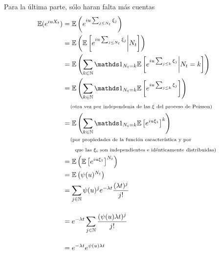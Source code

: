 Para la última parte, sólo haran falta más cuentas
\begin{align}
        \E(e^{iuX_t})   &=  \E\left( e^{iu \sum_{j \leq N_t} \xi_j }  \right)                                                                       \\
                        &=  \E\left( \E\left[e^{iu \sum_{j \leq N_t} \xi_j } \bigg| N_t \right]\right)                                              \\
                        &=  \E\left( \sum_{k \in \N} \indic_{N_t = k} \E\left[e^{iu \sum_{j \leq k} \xi_j } \bigg| N_t = k \right]\right)           \\
                        &=  \E\left( \sum_{k \in \N} \indic_{N_t = k} \E\left[e^{iu \sum_{j \leq k} \xi_j } \right]\right)                          \\
                        &\comment{otra vez por independenia de las $\xi$ del proceso de Poisson}                                                    \\
                        &=  \E\left( \sum_{k \in \N} \indic_{N_t = k} \E\left[e^{iu \xi_1 } \right]^k \right)                                       \\
                        &\lcomment{por propiedades de la función característica y por}                                                              \\
                        &\rcomment{ que las $\xi_i$ son independientes e idénticamente distribuidas}                                                \\
                        &=  \E\left( \E\left[e^{iu \xi_1 } \right]^{N_t} \right)                                                                    \\
                        &=  \E\left( \psi(u)^{N_t} \right)                                                                                          \\
                        &=  \sum_{j \in \N} \psi(u)^{j} e^{- \lambda t} \frac{(\lambda t)^j}{j!}                                                    \\                                       \\
                        &=  e^{- \lambda t} \sum_{j \in \N}  \frac{(\psi(u) \lambda t)^j}{j!}                                                       \\                                       \\
                        &=  e^{- \lambda t} e^{\psi(u) \lambda t}                                                                                   \\                                       \\

\end{align}

